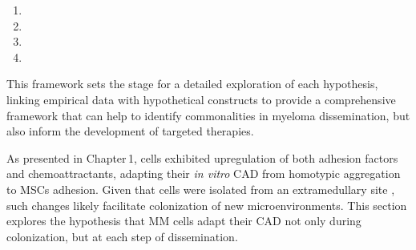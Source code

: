 \begin{enumerate}[parsep=4pt]
    \item \caddadaptation
    \item \caddadaptibility
    \item \cadddiversity
    \item \caddtrigger
\end{enumerate}


This framework sets the stage for a detailed exploration of each hypothesis,
linking empirical data with hypothetical constructs to provide a comprehensive
framework that can help to identify commonalities in myeloma dissemination, but
also inform the development of targeted therapies.




\unnsubsection{\caddadaptationtitle}%
\label{sec:discussion_caddadaptation}%
As presented in Chapter\,1, \MAina cells exhibited upregulation of both adhesion
factors and chemoattractants, adapting their \textit{in vitro} \ac{CAD} from
homotypic aggregation to \acp{MSC} adhesion. Given that \INA cells were isolated
from an extramedullary site 
\cite{burgerGp130RasMediated2001}, such changes likely facilitate colonization
of new microenvironments. This section explores the hypothesis that MM cells
adapt their \ac{CAD} not only during colonization, but at each step of
dissemination.



